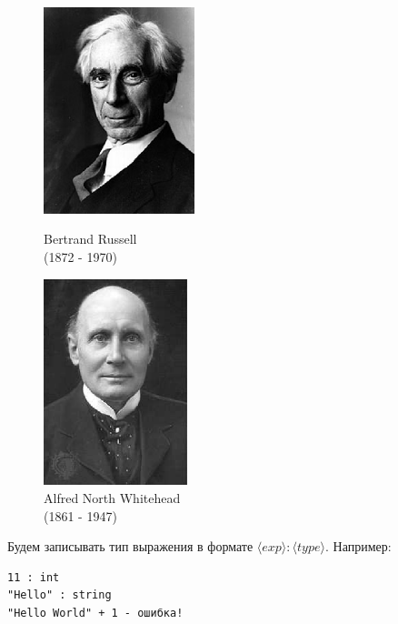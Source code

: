\documentclass[a4paper,11pt]{article}
\begin{document}
\begin{figure}[h]
  \begin{minipage}[h]{0.49\linewidth}
    \begin{center}
        \includegraphics[height=60mm]{lecture1/russell.eps}
        \caption{Bertrand Russell\\(1872 - 1970)}
    \end{center}
  \end{minipage}
  \begin{minipage}[h]{0.49\linewidth}
    \begin{center}
      \includegraphics[height=60mm]{lecture1/whitehead.eps}
      \caption{Alfred North Whitehead\\(1861 - 1947)}
    \end{center}
  \end{minipage}
\end{figure}

Будем записывать тип выражения в формате $\langle exp \rangle : \langle type
\rangle$. Например:
\begin{lstlisting}
11 : int
"Hello" : string
"Hello World" + 1 - ошибка!
\end{lstlisting}
\end{document}
